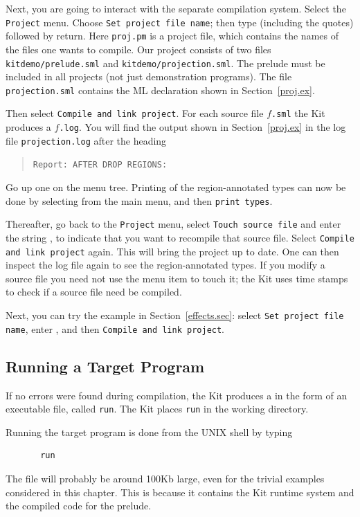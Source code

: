 \documentclass[12pt]{book}
\begin{document}
Next, you are going to interact with the separate compilation system.
Select the \texttt{Project} menu.  Choose
\texttt{Set project file name}; then type  (including
the quotes) followed by return.  
Here {\tt proj.pm} is a project file, which contains the
names of the files one wants to compile.  Our project consists of two
files {\tt kitdemo/prelude.sml} and {\tt kitdemo/projection.sml}.  
The prelude must be
included in all projects (not just demonstration programs). The file
{\tt projection.sml} contains the ML
declaration shown in Section~\ref{proj.ex}.

Then select {\tt Compile and link project}. For each source file
$f$\texttt{.sml} the Kit produces a 
$f$\texttt{.log}.  You will find the output shown in
Section~\ref{proj.ex} in the log file {\tt projection.log} after the
heading
\begin{quote}
{\tt Report: AFTER DROP REGIONS:}
\end{quote}
Go up one on the menu tree.  Printing of the region-annotated types
can now be done by selecting  from the main menu, and
then \texttt{print types}.

Thereafter, go back to the {\tt Project} menu, select {\tt Touch
  source file} and enter the string , to
indicate that you want to recompile that
source file.  Select {\tt Compile and link project} again.  This will
bring the project up to date. One can then inspect the log file again
to see the region-annotated types.  If you modify a source file you
need not use the menu item to touch it; the Kit uses time stamps to
check if a source file need be compiled.

Next, you can try the example in Section~\ref{effects.sec}: select
\texttt{Set project file name}, enter , and then
{\tt Compile and link project}.

\subsection{Running a Target Program}
If no errors were found during compilation, the Kit produces a
 in the form of an
executable file, called {\tt run}. The Kit places {\tt run} in the
working directory.

Running the target program is done from the UNIX shell by typing 
\begin{verbatim}
       run
\end{verbatim}
The file will probably be around 100Kb large, even for the 
trivial examples considered in this chapter.  
This is because it contains the Kit runtime system and the compiled code for
the prelude.
\end{document}
